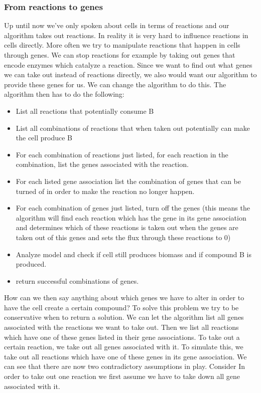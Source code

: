 \documentclass[12pt]{report}
\begin{document}
\subsubsection{From reactions to genes}
Up until now we've only spoken about cells in terms of reactions and our algorithm takes out reactions. In reality it is very hard to influence reactions in cells directly.
More often we try to manipulate reactions that happen in cells through genes.
We can stop reactions for example by taking out genes that encode enzymes which catalyze a reaction.
Since we want to find out what genes we can take out instead of reactions directly, we also would want our algorithm to provide these genes for us.
We can change the algorithm to do this.
The algorithm then has to do the following:
\begin{itemize}
\item List all reactions that potentially consume B
\item List all combinations of reactions that when taken out potentially can make the cell produce B
\item For each combination of reactions just listed, for each reaction in the combination, list the genes associated with the reaction.
\item For each listed gene association list the combination of genes that can be turned of in order to make the reaction no longer happen.
\item For each combination of genes just listed, turn off the genes (this means the algorithm will find each reaction which has the gene in its gene association and determines which of these reactions is taken out when the genes are taken out of this genes and sets the flux through these reactions to 0)
\item Analyze model and check if cell still produces biomass and if compound B is produced.
\item return successful combinations of genes.
\end{itemize}

How can we then say anything about which genes we have to alter in order to have the cell create a certain compound?
To solve this problem we try to be conservative when to return a solution. We can let the algorithm list all genes associated with the reactions we want to take out. Then we list all reactions which have one of these genes listed in their gene associations. To take out a certain reaction, we take out all genes associated with it. To simulate this, we take out all reactions which have one of these genes in its gene association. We can see that there are now two contradictory assumptions in play. Consider  In order to take out one reaction we first assume we have to take down all gene associated with it.
\end{document}
